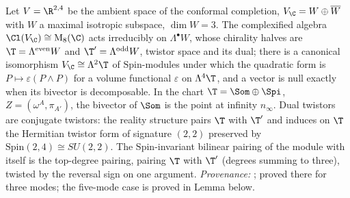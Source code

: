 Let $V = \R^{2,4}$ be the ambient space of the conformal completion, $V_{\C} = W \oplus \overline{W}$ with $W$ a maximal isotropic subspace, $\dim W = 3$. The complexified algebra $\Cl(V_{\C}) \cong \mathrm{M}_{8}(\C)$ acts irreducibly on $\Lambda^{\bullet}W$, whose chirality halves are $\T = \Lambda^{\mathrm{even}}W$ and $\T' = \Lambda^{\mathrm{odd}}W$, twistor space and its dual; there is a canonical isomorphism $V_{\C} \cong \Lambda^{2}\T$ of $\mathrm{Spin}$-modules under which the quadratic form is $P \mapsto \varepsilon(P \wedge P)$ for a volume functional $\varepsilon$ on $\Lambda^{4}\T$, and a vector is null exactly when its bivector is decomposable. In the chart $\T = \Som \oplus \Spi$, $Z = (\omega^{A}, \pi_{A'})$, the bivector of $\Som$ is the point at infinity $n_{\infty}$. Dual twistors are conjugate twistors: the reality structure pairs $\T$ with $\T'$ and induces on $\T$ the Hermitian twistor form of signature $(2,2)$ preserved by $\mathrm{Spin}(2,4) \cong SU(2,2)$. The $\mathrm{Spin}$-invariant bilinear pairing of the module with itself is the top-degree pairing, pairing $\T$ with $\T'$ (degrees summing to three), twisted by the reversal sign on one argument. \emph{Provenance:} \cite[Thms.~3.1, 3.4, Prop.~4.5]{ButlerT9}; proved there for three modes; the five-mode case is proved in Lemma  below.
